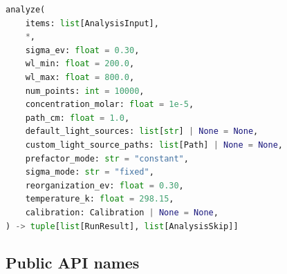 \documentclass[11pt,a4paper]{article}
\begin{document}
\begin{lstlisting}[language=Python]
analyze(
    items: list[AnalysisInput],
    *,
    sigma_ev: float = 0.30,
    wl_min: float = 200.0,
    wl_max: float = 800.0,
    num_points: int = 10000,
    concentration_molar: float = 1e-5,
    path_cm: float = 1.0,
    default_light_sources: list[str] | None = None,
    custom_light_source_paths: list[Path] | None = None,
    prefactor_mode: str = "constant",
    sigma_mode: str = "fixed",
    reorganization_ev: float = 0.30,
    temperature_k: float = 298.15,
    calibration: Calibration | None = None,
) -> tuple[list[RunResult], list[AnalysisSkip]]
\end{lstlisting}

\subsection*{Public API names}
\end{document}
